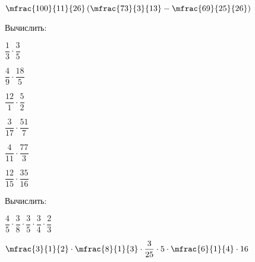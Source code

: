 \begin{class}[number=4]
\begin{listofex}
\begin{enumcols}[itemcolumns=2]
			\item \( \mfrac{100}{11}{26}\left( \mfrac{73}{3}{13}-\mfrac{69}{25}{26} \right) \)
		\end{enumcols}
		\item Вычислить:
		\begin{enumcols}[columns=6]
			\item \( \dfrac{1}{3}\cdot\dfrac{3}{5} \)
			\item \( \dfrac{4}{9}\cdot\dfrac{18}{5} \)
			\item \( \dfrac{12}{1}\cdot\dfrac{5}{2} \)
			\item \( \dfrac{3}{17}\cdot\dfrac{51}{7} \)
			\item \( \dfrac{4}{11}\cdot\dfrac{77}{3} \)
			\item \( \dfrac{12}{15}\cdot\dfrac{35}{16} \)
		\end{enumcols}
		\item Вычислить:
		\begin{enumcols}[columns=2]
			\item \( \dfrac{4}{5}\cdot\dfrac{3}{8}\cdot\dfrac{3}{5}\cdot\dfrac{3}{4}\cdot\dfrac{2}{3} \)
			\item \( \mfrac{3}{1}{2}\cdot\mfrac{8}{1}{3}\cdot\dfrac{3}{25}\cdot5\cdot\mfrac{6}{1}{4}\cdot16 \)
		\end{enumcols}
	\end{listofex}
\end{class}
